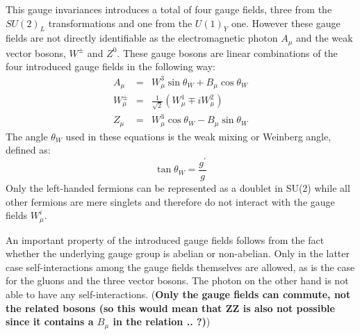 \begin{myindentpar}
\begin{description}
    This gauge invariances introduces a total of four gauge fields, three from the $SU(2)_L$ transformations and one from the $U(1)_Y$ one.
    However these gauge fields are not directly identifiable as the electromagnetic photon $A_{\mu}$ and the weak vector bosons, $W^{\pm}$ and $Z^{0}$.
    These gauge bosons are linear combinations of the four introduced gauge fields in the following way: %
    \begin{eqnarray}
     A_{\mu} & = & W_{\mu}^{3} \sin \theta_{W} + B_{\mu} \cos \theta_{W} \nonumber \\
     W_{\mu}^{\pm} & = & \frac{1}{\sqrt{2}} \left( W_{\mu}^{1} \mp i W_{\mu}^{2} \right) \label{eq::EWGaugeBosons} \\
     Z_{\mu} & = & W_{\mu}^{3} \cos \theta_{W} - B_{\mu} \sin \theta_{W} \nonumber
    \end{eqnarray}
    The angle $\theta_{W}$ used in these equations is the weak mixing or Weinberg angle, defined as:
    \begin{equation}
     \tan \theta_{W} = \frac{g^{'}}{g}
    \end{equation}
    Only the left-handed fermions can be represented as a doublet in SU(2) while all other fermions are mere singlets and therefore do not interact with the gauge fields $W_{\mu}^{i}$. 
   \end{description}
\end{myindentpar}

An important property of the introduced gauge fields follows from the fact whether the underlying gauge group is abelian or non-abelian. Only in the latter case self-interactions among the gauge fields themselves are allowed, as is the case for the gluons and the three vector bosons. The photon on the other hand is not able to have any self-interactions. (\textbf{Only the gauge fields can commute, not the related bosons (so this would mean that ZZ is also not possible since it contains a $B_{\mu}$ in the relation .. ?)})

